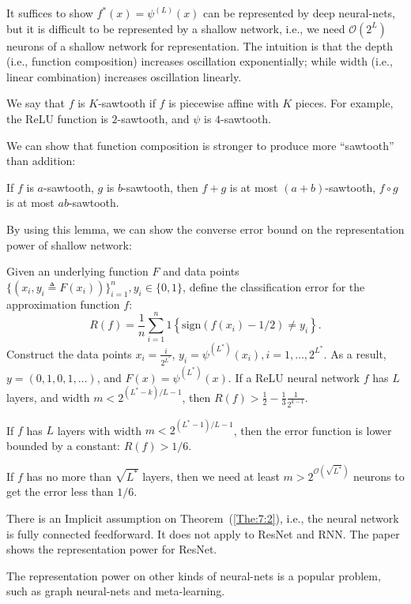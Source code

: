It suffices to show $f^*(x) = \psi^{(L)}(x)$ can be represented by deep neural-nets, but it is difficult to be represented by a shallow network, i.e., we need $\mathcal{O}(2^{L})$ neurons of a shallow network for representation.
The intuition is that the 
depth (i.e., function composition) increases oscillation exponentially;
while 
width (i.e., linear combination) increases oscillation linearly.
\begin{definition}
We say that $f$ is $K$-sawtooth if $f$ is piecewise affine with $K$ pieces.
For example, the ReLU function is $2$-sawtooth, and $\psi$ is $4$-sawtooth.
\end{definition}
We can show that function composition is stronger to produce more ``sawtooth'' than addition:
\begin{lemma}
If $f$ is $a$-sawtooth, $g$ is $b$-sawtooth, 
then $f+g$ is at most $(a+b)$-sawtooth, $f\circ g$ is at most $ab$-sawtooth.
\end{lemma}
By using this lemma, we can show the converse error bound on the representation power of shallow network:
\begin{theorem}\label{The:7:2}
Given an underlying function $F$ and data points $\{(x_i,y_i\triangleq F(x_i))\}_{i=1}^n, y_i\in\{0,1\}$, define the classification error for the approximation function $f$:
\[
R(f) = \frac{1}{n}\sum_{i=1}^n1\left\{
\text{sign}(f(x_i) - 1/2)\ne y_i
\right\}.
\]
Construct the data points $x_i=\frac{i}{2^{L^*}}$, $y_i=\psi^{(L^*)}(x_i), i=1,\dots,2^{L^*}$. As a result, $y=(0,1,0,1,\dots)$, and $F(x) = \psi^{(L^*)}(x)$.
If a ReLU neural network $f$ has $L$ layers, and width $m<2^{(L^*-k)/L-1}$, then
$R(f)>\frac{1}{2}-\frac{1}{3}\frac{1}{2^{k-1}}$.
\end{theorem}

\begin{corollary}
If $f$ has $L$ layers with width $m<2^{(L^*-1)/L-1}$, then the error function is lower bounded by a constant: $R(f)>1/6$.
\end{corollary}

\begin{corollary}
If $f$ has no more than $\sqrt{L^*}$ layers, then we need at least $m>2^{\mathcal{O}(\sqrt{L^*})}$ neurons to get the error less than $1/6$.
\end{corollary}


\begin{remark}
There is an Implicit assumption on Theorem~(\ref{The:7:2}), i.e., the neural network is fully connected feedforward.
It does not apply to ResNet and RNN.
The paper \citep{NIPS2018_7855} shows the representation power for ResNet.
\end{remark}
\begin{remark}
The representation power on other kinds of neural-nets is a popular problem, such as graph neural-nets and meta-learning.
\end{remark}

